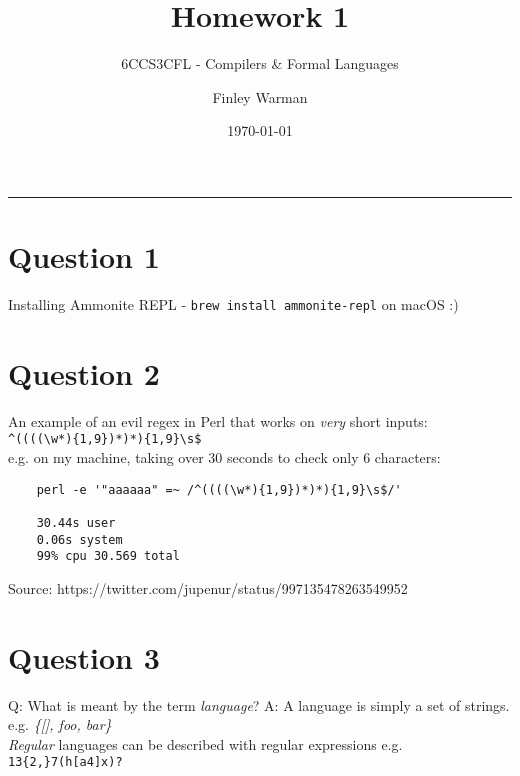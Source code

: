 \documentclass[english]{scrartcl}
\begin{document}


\subtitle{6CCS3CFL - Compilers \& Formal Languages}
\title{Homework 1}
\author{Finley Warman}
\date{\today}

\maketitle


\tableofcontents
\par\noindent\rule{\textwidth}{0.4pt}


\newpage


\section*{Question 1}
Installing Ammonite REPL - \verb|brew install ammonite-repl| on macOS :)

\section*{Question 2}
An example of an evil regex in Perl that works on \textit{very} short inputs:
\\
\verb|^((((\w*){1,9})*)*){1,9}\s$|
\\
e.g. on my machine, taking over 30 seconds to check only 6 characters:
\begin{Verbatim}
    perl -e '"aaaaaa" =~ /^((((\w*){1,9})*)*){1,9}\s$/'

    30.44s user
    0.06s system
    99% cpu 30.569 total
\end{Verbatim}
Source: https://twitter.com/jupenur/status/997135478263549952


\section*{Question 3}
Q: What is meant by the term \textit{language}?
\newline
A: A language is simply a set of strings. e.g. \textit{\{[], foo, bar\}} \\
\textit{Regular} languages can be described with regular expressions e.g. \verb~13{2,}7(h[a4]x)?~
\end{document}
